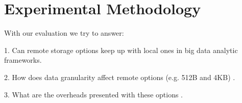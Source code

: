 \section{Experimental Methodology}
With our evaluation we try to answer: 

1. Can remote storage options keep up with local ones in big data analytic
frameworks. 

2. How does data granularity affect remote options (e.g. 512B and 4KB) .

3. What are the overheads presented with these options .

\vspace{1em}

